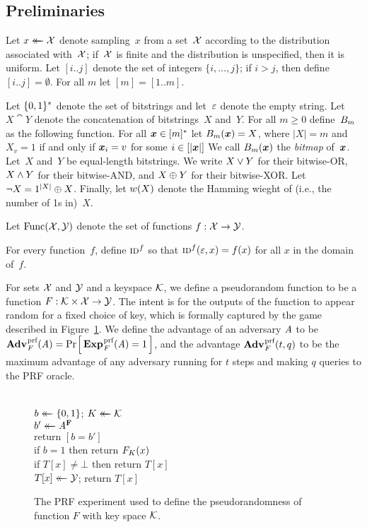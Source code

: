 \subsection{Preliminaries}
\label{sec:prelims}

Let $x \mathrel{\leftarrow\mkern-14mu\leftarrow} \mathcal{X}$ denote sampling~$x$ from a set~$\mathcal{X}$ according to the
distribution associated with~$\mathcal{X}$; if~$\mathcal{X}$ is finite and the distribution
is unspecified, then it is uniform.
%
Let $[i..j]$ denote the set of integers $\{i, \ldots, j\}$; if $i > j$, then
define $[i..j] = \emptyset$. For all $m$ let $[m] = [1..m]$.

Let $\{0,1\}^*$ denote the set of bitstrings and let~$\varepsilon$ denote the empty
string.
%
Let $X \cat Y$ denote the concatenation of bitstrings~$X$ and~$Y$.
%
For all $m\geq0$ define~${B}_m$ as the following function.  For all
$\v.x\in[m]^*$ let $\bmap_m(\v.x) = X$, where $|X|=m$ and $X_v=1$ if and only if
$\v.x_i = v$ for some $i\in[|\v.x|]$
%
We call $\bmap_m(\v.x)$ the \emph{bitmap} of~$\v.x$.
%
Let~$X$ and~$Y$ be equal-length bitstrings. We write $X \vee Y$ for their
bitwise-OR, $X \wedge Y$ for their bitwise-AND, and $X \mathbin{\oplus} Y$ for their
bitwise-XOR. Let $\neg X = 1^{|X|} \mathbin{\oplus} X$.
%
Finally, let ${w}(X)$ denote the Hamming wieght of (i.e., the number of 1s
in)~$X$.

Let $\mathrm{Func}(\mathcal{X},\mathcal{Y})$ denote the set of functions $f:\mathcal{X}\to\mathcal{Y}$.

For every function~$f$, define $\textnormal{\textsc{id}}^f$ so that
$\textnormal{\textsc{id}}^f(\varepsilon, x) = f(x)$ for all $x$ in the domain of~$f$.


%
For sets $\mathcal{X}$ and $\mathcal{Y}$ and a keyspace $\mathcal{K}$, we define a pseudorandom
function to be a function $F: \mathcal{K} \times \mathcal{X} \to \mathcal{Y}$. The intent is for
the outputs of the function to appear random for a fixed choice of key, which is
formally captured by the game described in Figure~\ref{fig:prf-def}. We define
the advantage of an adversary $\mathit{A}$ to be
$\Adv{\prf}_F(\advA) = \Prob{\Exp{\prf}_F(\advA) = 1}$, and the advantage
$\Adv{\prf}_F(t,q)$ to be the maximum advantage of any adversary running for $t$
steps and making $q$ queries to the PRF oracle.

\begin{figure}
  {
    \\[2pt]
      $b \mathrel{\leftarrow\mkern-14mu\leftarrow} \{0,1\}$; $K \mathrel{\leftarrow\mkern-14mu\leftarrow} \mathcal{K}$\\
      $b' \mathrel{\leftarrow\mkern-14mu\leftarrow} \mathit{A}^{\textup{\textbf{F}}\hspace{0.5pt}}$\\
      return $[b = b']$
  }
  {
    \\[2pt]
      if $b = 1$ then return $F_K(x)$\\
      if $T[x] \neq \bot$ then return $T[x]$\\
      $T[x] \mathrel{\leftarrow\mkern-14mu\leftarrow} \mathcal{Y}$; return $T[x]$
  }
  \caption{The PRF experiment used to define the pseudorandomness of function
  $F$ with key space $\mathcal{K}$.
  }
  \label{fig:prf-def}
\end{figure}

